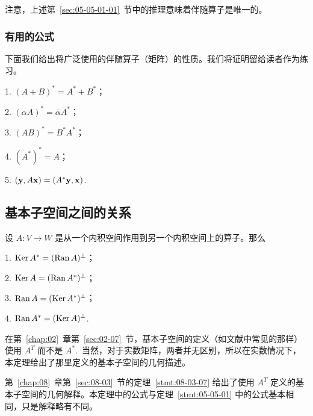 注意，上述第~\ref{sec:05-05-01-01}~节中的推理意味着伴随算子是唯一的。

\subsubsection{有用的公式}\label{sec:05-05-01-03}

下面我们给出将广泛使用的伴随算子（矩阵）的性质。我们将证明留给读者作为练习。

1. $(A + B)^* = A^* + B^*$；

2. $(\alpha A)^* = \overline{\alpha} A^*$；

3. $(AB)^* = B^*A^*$；

4. $(A^*)^* = A$；

5. $(\mathbf{y}, A\mathbf{x}) = (A^*\mathbf{y}, \mathbf{x})$.~

\subsection{基本子空间之间的关系}\label{sec:05-05-02}


\begin{theorem}\label{stmt:05-05-01} 设 $A: V \to W$ 是从一个内积空间作用到另一个内积空间上的算子。那么

1. $\operatorname{Ker} A^* = (\operatorname{Ran} A)^\perp$；

2. $\operatorname{Ker} A = (\operatorname{Ran} A^*)^\perp$；

3. $\operatorname{Ran} A = (\operatorname{Ker} A^*)^\perp$；

4. $\operatorname{Ran} A^* = (\operatorname{Ker} A)^\perp$.~\end{theorem}

\begin{remark*}
在第~\ref{chap:02}~章第~\ref{sec:02-07}~节，基本子空间的定义（如文献中常见的那样）使用 $A^T$ 而不是 $A^*$.~当然，对于实数矩阵，两者并无区别，所以在实数情况下，本定理给出了那里定义的基本子空间的几何描述。
\end{remark*}

第~\ref{chap:08}~章第~\ref{sec:08-03}~节的定理~\ref{stmt:08-03-07} 给出了使用 $A^T$ 定义的基本子空间的几何解释。本定理中的公式与定理~\ref{stmt:05-05-01} 中的公式基本相同，只是解释略有不同。

